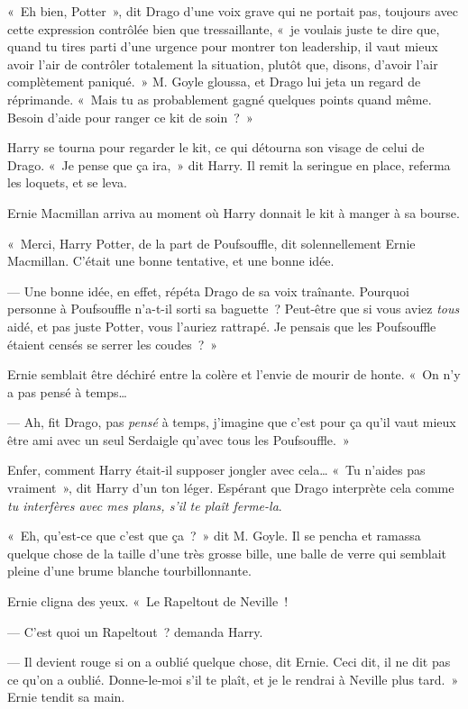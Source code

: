 «~Eh bien, Potter~», dit Drago d'une voix grave qui ne portait pas, toujours avec cette expression contrôlée bien que tressaillante, «~je voulais juste te dire que, quand tu tires parti d'une urgence pour montrer ton leadership, il vaut mieux avoir l'air de contrôler totalement la situation, plutôt que, disons, d'avoir l'air complètement paniqué.~»
M. Goyle gloussa, et Drago lui jeta un regard de réprimande.
«~Mais tu as probablement gagné quelques points quand même.
Besoin d'aide pour ranger ce kit de soin~?~»

Harry se tourna pour regarder le kit, ce qui détourna son visage de celui de Drago.
«~Je pense que ça ira,~» dit Harry.
Il remit la seringue en place, referma les loquets, et se leva.

Ernie Macmillan arriva au moment où Harry donnait le kit à manger à sa bourse.

«~Merci, Harry Potter, de la part de Poufsouffle, dit solennellement Ernie Macmillan.
C'était une bonne tentative, et une bonne idée.

--- Une bonne idée, en effet, répéta Drago de sa voix traînante.
Pourquoi personne à Poufsouffle n'a-t-il sorti sa baguette~?
Peut-être que si vous aviez \emph{tous} aidé, et pas juste Potter, vous l'auriez rattrapé.
Je pensais que les Poufsouffle étaient censés se serrer les coudes~?~»

Ernie semblait être déchiré entre la colère et l'envie de mourir de honte.
«~On n'y a pas pensé à temps…

--- Ah, fit Drago, pas \emph{pensé} à temps, j'imagine que c'est pour ça qu'il vaut mieux être ami avec un seul Serdaigle qu'avec tous les Poufsouffle.~»

Enfer, comment Harry était-il supposer jongler avec cela…
«~Tu n'aides pas vraiment~», dit Harry d'un ton léger.
Espérant que Drago interprète cela comme \emph{tu interfères avec mes plans, s'il te plaît ferme-la}.

«~Eh, qu'est-ce que c'est que ça~?~»
dit M. Goyle.
Il se pencha et ramassa quelque chose de la taille d'une très grosse bille, une balle de verre qui semblait pleine d'une brume blanche tourbillonnante.

Ernie cligna des yeux.
«~Le Rapeltout de Neville~!

--- C'est quoi un Rapeltout~? demanda Harry.

--- Il devient rouge si on a oublié quelque chose, dit Ernie.
Ceci dit, il ne dit pas ce qu'on a oublié.
Donne-le-moi s'il te plaît, et je le rendrai à Neville plus tard.~»
Ernie tendit sa main.

